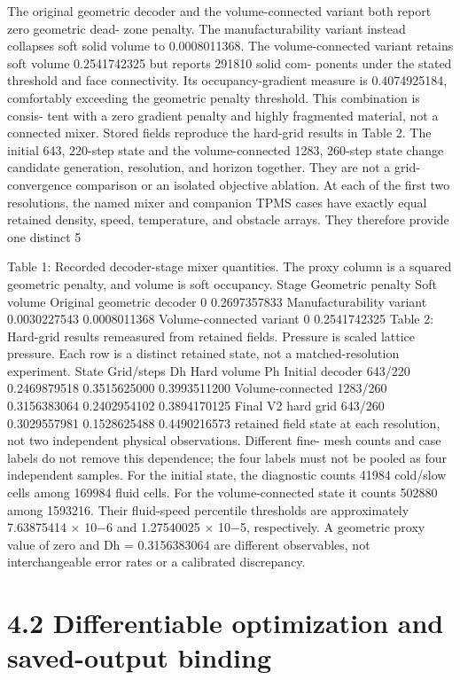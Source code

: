 \documentclass[11pt]{article}
\begin{document}
The original geometric decoder and the volume-connected variant both report zero geometric dead-
zone penalty. The manufacturability variant instead collapses soft solid volume to 0.0008011368.
The volume-connected variant retains soft volume 0.2541742325 but reports 291810 solid com-
ponents under the stated threshold and face connectivity. Its occupancy-gradient measure is
0.4074925184, comfortably exceeding the geometric penalty threshold. This combination is consis-
tent with a zero gradient penalty and highly fragmented material, not a connected mixer.
Stored fields reproduce the hard-grid results in Table 2. The initial 643, 220-step state and
the volume-connected 1283, 260-step state change candidate generation, resolution, and horizon
together. They are not a grid-convergence comparison or an isolated objective ablation.
At each of the first two resolutions, the named mixer and companion TPMS cases have exactly
equal retained density, speed, temperature, and obstacle arrays. They therefore provide one distinct
5

Table 1: Recorded decoder-stage mixer quantities. The proxy column is a squared geometric
penalty, and volume is soft occupancy.
Stage Geometric penalty Soft volume
Original geometric decoder 0 0.2697357833
Manufacturability variant 0.0030227543 0.0008011368
Volume-connected variant 0 0.2541742325
Table 2: Hard-grid results remeasured from retained fields. Pressure is scaled lattice pressure. Each
row is a distinct retained state, not a matched-resolution experiment.
State Grid/steps Dh Hard volume Ph
Initial decoder 643/220 0.2469879518 0.3515625000 0.3993511200
Volume-connected 1283/260 0.3156383064 0.2402954102 0.3894170125
Final V2 hard grid 643/260 0.3029557981 0.1528625488 0.4490216573
retained field state at each resolution, not two independent physical observations. Different fine-
mesh counts and case labels do not remove this dependence; the four labels must not be pooled as
four independent samples.
For the initial state, the diagnostic counts 41984 cold/slow cells among 169984 fluid cells. For the
volume-connected state it counts 502880 among 1593216. Their fluid-speed percentile thresholds
are approximately 7.63875414 \ensuremath{\times} 10\ensuremath{-}6 and 1.27540025 \ensuremath{\times} 10\ensuremath{-}5, respectively. A geometric proxy
value of zero and Dh = 0.3156383064 are different observables, not interchangeable error rates or a
calibrated discrepancy.

\section*{4.2 Differentiable optimization and saved-output binding}
\end{document}
